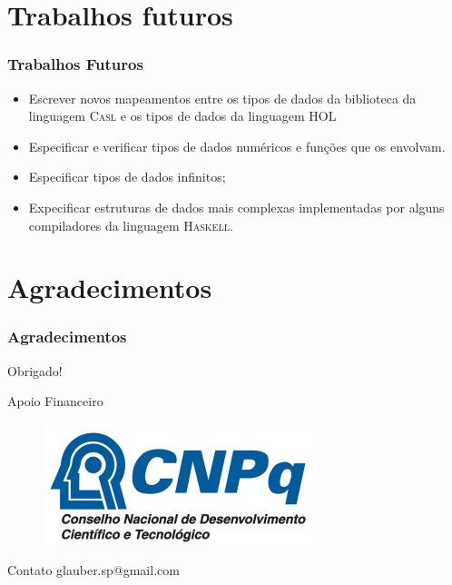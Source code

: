 \documentclass{beamer}
\newcommand{\CASL}{\textsc{Casl}\xspace}
\newcommand{\Haskell}{\textsc{Haskell}\xspace}
\newcommand{\HOL}{\textsc{HOL}\xspace}
\begin{document}
\section{Trabalhos futuros}

\begin{frame}
	\frametitle{Trabalhos Futuros}
	
	\begin{itemize}
		\item Escrever novos mapeamentos entre os tipos de dados da biblioteca da linguagem \CASL e os tipos de dados da linguagem \HOL
		\item Especiﬁcar e veriﬁcar tipos de dados numéricos e funções que os envolvam.
		\item Especiﬁcar tipos de dados inﬁnitos;
		\item Expecificar estruturas de dados mais complexas implementadas por alguns compiladores da linguagem \Haskell.
	\end{itemize}
\end{frame}

\section{Agradecimentos}

\begin{frame}
  \frametitle{Agradecimentos}

\begin{block}{Obrigado!}
\end{block}

\begin{block}{Apoio Financeiro}
	\begin{figure}
	      \includegraphics[scale=0.3]{figuras/cnpq}
	  \end{figure}
\end{block}

\begin{block}{Contato}
glauber.sp@gmail.com
\end{block}
\end{frame}
\end{document}
